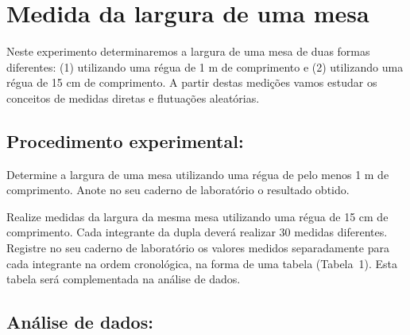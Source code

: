 \chapter{Medida da largura de uma mesa}

\vspace{-0.7cm}


Neste experimento determinaremos a largura de uma mesa de duas formas diferentes: (1) utilizando uma régua de 1 m de comprimento e (2) utilizando uma régua de 15 cm de comprimento. A partir destas medições vamos estudar os conceitos de medidas diretas e flutuações aleatórias.

\vspace{-0.7cm}
\section*{Procedimento experimental:}

\begin{num}
\item Determine a largura de uma mesa utilizando uma régua de pelo menos 1 m de comprimento.  Anote no seu caderno de laboratório o resultado obtido. 
\item Realize medidas da largura da mesma mesa utilizando uma régua de 15 cm de comprimento. Cada integrante da dupla deverá realizar 30 medidas diferentes. Registre no seu caderno de laboratório os valores medidos separadamente para cada integrante na ordem cronológica, na forma de uma tabela (Tabela~1).  Esta tabela será complementada na análise de dados.
\end{num}

\vspace{-0.7cm}
\section*{Análise de dados:}

